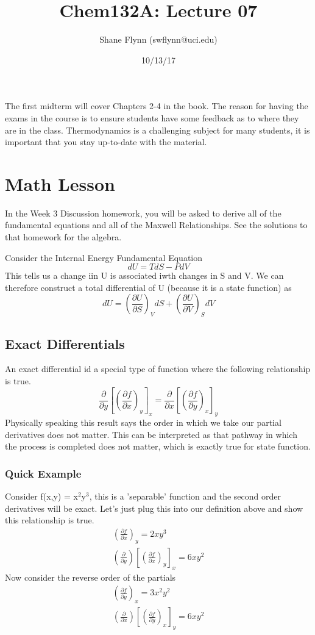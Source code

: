 \documentclass{article}
\title{Chem132A: Lecture 07}
\author{Shane Flynn (swflynn@uci.edu) }
\date{10/13/17}
\newcommand{\be}{\begin{equation}}
\newcommand{\ee}{\end{equation}}
\newcommand{\pd}{\partial}
\begin{document}
\maketitle


The first midterm will cover Chapters 2-4 in the book. 
The reason for having the exams in the course is to ensure students have some feedback as to where they are in the class.
Thermodynamics is a challenging subject for many students, it is important that you stay up-to-date with the material. 

\section*{Math Lesson}
In the Week 3 Discussion homework, you will be asked to derive all of the fundamental equations and all of the Maxwell Relationships.
See the solutions to that homework for the algebra. 

Consider the Internal Energy Fundamental Equation
\be
dU = TdS - PdV
\ee
This tells us a change iin U is associated iwth changes in S and V.
We can therefore construct a total differential of U (because it is a state function) as
\be
dU = \left(\frac{\pd U}{\pd S}\right)_V dS + \left(\frac{\pd U}{\pd V}\right)_S dV
\ee

\subsection*{Exact Differentials}
An exact differential id a special type of function where the following relationship is true.
\be
    \frac{\partial}{\partial y} \left[\left(\frac{\partial f}{\partial x}\right)_y \right]_x =  \frac{\partial}{\partial x} \left[\left(\frac{\partial f}{\partial y}\right)_x \right]_y
\ee
Physically speaking this result says the order in which we take our partial derivatives does not matter. 
This can be interpreted as that pathway in which the process is completed does not matter, which is exactly true for state function. 

\subsubsection*{Quick Example}
Consider f(x,y) = x$^2$y$^3$, this is a 'separable' function and the second order derivatives will be exact. 
Let's just plug this into our definition above and show this relationship is true. 
\be
\begin{split}
    \left(\frac{\partial f}{\partial x}\right)_y = 2xy^3 \\
    \left(\frac{\partial}{\partial y}\right)\left[ \left(\frac{\partial f}{\partial x}\right)_y\right]_x = 6xy^2
    \end{split}
\ee
Now consider the reverse order of the partials
\be
\begin{split}
    \left(\frac{\partial f}{\partial y}\right)_x = 3x^2y^2 \\
    \left(\frac{\partial}{\partial x}\right)\left[ \left(\frac{\partial f}{\partial y}\right)_x\right]_y = 6xy^2
    \end{split}
\ee
\end{document}
